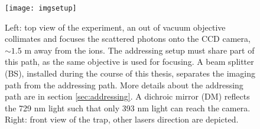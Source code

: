 \begin{figure}
\centering
\texttt{[image: imgsetup]}
\caption[Caption for LOF]{Left: top view of the experiment, an out of vacuum objective collimates and focuses the scattered photons onto the CCD camera, $\sim 1.5$ m away from the ions. The addressing setup must share part of this path, as the same objective is used for focusing.
A beam splitter (BS), installed during the course of this thesis, separates the imaging path from the addressing path. More details about the addressing path are in section \ref{sec:addressing}.
A dichroic mirror (DM) reflects the 729 nm light such that only 393 nm light can reach the camera. Right: front view of the trap, other lasers direction are depicted.}
\label{imgsetup}
\end{figure}

